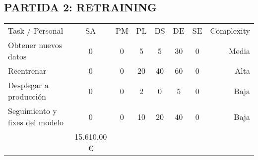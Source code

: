 \subsection{PARTIDA 2: RETRAINING}\label{subsec:partida-2:-retraining}
\begin{center}
    \renewcommand{\arraystretch}{1.0} %
    \setlength{\tabcolsep}{5pt} %
    \begin{tabular}{| >{\raggedright\arraybackslash}p{8cm} | c | c |c |c|c|c|r|}
        \hline
        \rowcolor[HTML]{DCDCDC}  \multicolumn{8}{|c|}{RETRAINING} \\ \hline
        Task / Personal                & SA & PM & PL & DS & DE & SE & Complexity \\ \hline
        Obtener nuevos datos           & 0  & 0  & 5  & 5  & 30 & 0  & Media      \\ \hline
        Reentrenar                     & 0  & 0  & 20 & 40 & 60 & 0  & Alta       \\ \hline
        Desplegar a producción         & 0  & 0  & 2  & 0  & 5  & 0  & Baja       \\ \hline
        Seguimiento y fixes del modelo & 0  & 0  & 10 & 20 & 40 & 0  & Baja       \\ \hline
        \hline \multicolumn{7}{|c|}{Total} & 15.610,00 \euro \\ \hline
    \end{tabular}
\end{center}

